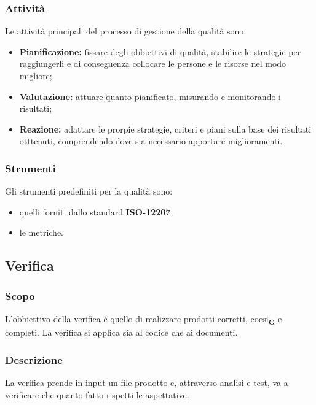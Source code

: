         \subsubsection{Attività}
        Le attività principali del processo di gestione della qualità sono:
        \begin{itemize}
            \item \textbf{Pianificazione:} fissare degli obbiettivi di qualità, stabilire le strategie per raggiungerli e di conseguenza collocare le persone e le risorse nel modo migliore;
            \item \textbf{Valutazione:} attuare quanto pianificato, misurando e monitorando i risultati;
            \item \textbf{Reazione:} adattare le prorpie strategie, criteri e piani sulla base dei risultati otttenuti, comprendendo dove sia necessario apportare miglioramenti.
        \end{itemize}
        \subsubsection{Strumenti}
        Gli strumenti predefiniti per la qualità sono:
        \begin{itemize}
            \item quelli forniti dallo standard \textbf{ISO-12207};
            \item le metriche.
        \end{itemize}
    \subsection{Verifica}
        \subsubsection{Scopo}
        L'obbiettivo della verifica è quello di realizzare prodotti corretti, coesi\textsubscript{\textbf{G}} e completi. La verifica si applica sia al codice che ai documenti.
        \subsubsection{Descrizione}
        La verifica prende in input un file prodotto e, attraverso analisi e test, va a verificare che quanto fatto rispetti le aspettative.
